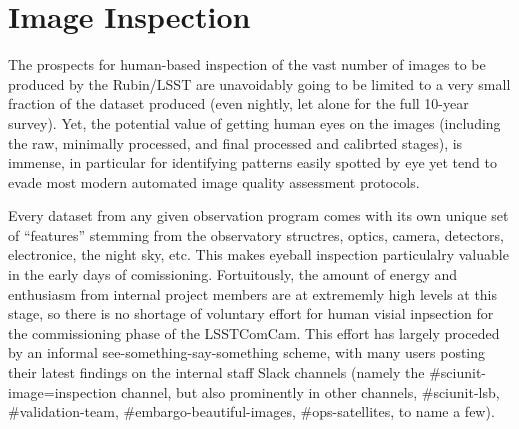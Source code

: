 \section{Image Inspection}
\label{sec:image_inspection}

The prospects for human-based inspection of the vast number of images to be
produced by the Rubin/LSST are unavoidably going to be limited to a very small
fraction of the dataset produced (even nightly, let alone for the full 10-year
survey).  Yet, the potential value of getting human eyes on the images (including
the raw, minimally processed, and final processed and calibrted stages), is
immense, in particular for identifying patterns easily spotted by eye yet tend
to evade most modern automated image quality assessment protocols.

Every dataset from any given observation program comes with its own unique set
of ``features'' stemming from the observatory structres, optics, camera,
detectors, electronice, the night sky, etc.  This makes eyeball inspection
particulalry valuable in the early days of comissioning.  Fortuitously, the
amount of energy and enthusiasm from internal project members are at extrememly
high levels at this stage, so there is no shortage of voluntary effort for
human visial inpsection for the commissioning phase of the LSSTComCam.  This
effort has largely proceded by an informal see-something-say-something scheme,
with many users posting their latest findings on the internal staff Slack
channels (namely the \#sciunit-image=inspection channel, but also prominently
in other channels, \#sciunit-lsb, \#validation-team, \#embargo-beautiful-images,
\#ops-satellites, to name a few).

